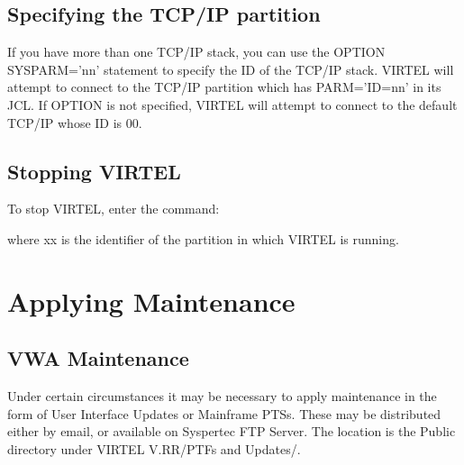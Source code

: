 \documentclass[letterpaper,10pt,english]{sphinxmanual}
\begin{document}
\sphinxAtStartPar
{}


\subsection{Specifying the TCP/IP partition}
\label{\detokenize{Installation_Guide:specifying-the-tcp-ip-partition}}
\sphinxAtStartPar
If you have more than one TCP/IP stack, you can use the OPTION SYSPARM=’nn’ statement to specify the ID of the TCP/IP stack. VIRTEL will attempt to connect to the TCP/IP partition which has PARM=’ID=nn’ in its JCL. If OPTION is not specified, VIRTEL will attempt to connect to the default TCP/IP whose ID is 00.


\subsection{Stopping VIRTEL}
\label{\detokenize{Installation_Guide:id3}}
\sphinxAtStartPar
To stop VIRTEL, enter the command:

\begin{sphinxVerbatim}[commandchars=\\\{\}]
 
\end{sphinxVerbatim}

\sphinxAtStartPar
where xx is the identifier of the partition in which VIRTEL is running.

\newpage

\ignorespaces 

\section{Applying Maintenance}
\label{\detokenize{Installation_Guide:index-19}}\label{\detokenize{Installation_Guide:id4}}

\subsection{VWA Maintenance}
\label{\detokenize{Installation_Guide:vwa-maintenance}}
\sphinxAtStartPar
Under certain circumstances it may be necessary to apply maintenance in the form of User Interface Updates or Mainframe PTSs. These may be distributed either by e\sphinxhyphen{}mail, or available on Syspertec FTP Server. The location is the Public directory under VIRTEL V.RR/PTFs and Updates/.
\end{document}
